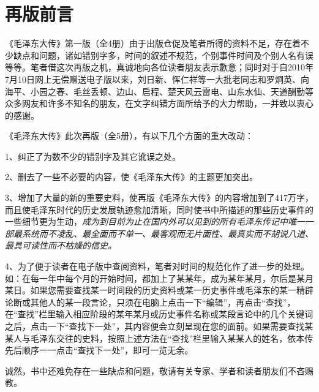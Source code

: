 \documentclass[../../dazhuan.tex]{subfiles}
\begin{document}
\clearpage
\chapter*{再版前言}
   
《毛泽东大传》第一版（全4册）由于出版仓促及笔者所得的资料不足，存在着不少缺点和问题，诸如错别字多，时间的叙述不规范，个别事件时间及个别人名有误等等。笔者借这次再版之机，真诚地向各位读者朋友表示歉意；同时对于自2010年7月10日网上无偿赠送电子版以来，刘日新、恽仁祥等一大批老同志和罗炯英、向海平、小园之春、毛丝丢顿、边山、启程、楚天风云雷电、山东水仙、天道酬勤等众多网友和许多不知名的朋友，在文字纠错方面所给予的大力帮助，一并致以衷心的感谢。

《毛泽东大传》此次再版（全5册），有以下几个方面的重大改动：

1、纠正了为数不少的错别字及其它讹误之处。

2、删去了一些不必要的内容，使《毛泽东大传》的主题更加突出。

3、增加了大量的新的重要史料，使再版《毛泽东大传》的内容增加到了417万字，而且使毛泽东时代的历史发展轨迹愈加清晰，同时使书中所描述的那些历史事件的一些细节更为生动，\emph{成为到目前为止在国内外可以见到的所有毛泽东传记中唯一一部最系统而不凌乱、最全面而不单一、最客观而无片面性、最真实而不胡说八道、最具可读性而不枯燥的信史。}

4、为了便于读者在电子版中查阅资料，笔者对时间的规范化作了进一步的处理。如：在每一年中每个月的开始时间，都加上了某某年，成为某年某月，尔后是某月某日。如果您需要查找某一时间段的历史资料或某一历史事件或毛泽东的某一精辟论断或其他人的某一段言论，只须在电脑上点击一下“编辑”，再点击“查找”，在“查找”栏里输入相应阶段的某年某月或历史事件名称或某段言论中的几个关键词之后，点击一下“查找下一处”，其内容便会立刻呈现在您的面前。如果需要查找某某人与毛泽东交往的史料，按照上述方法在“查找”栏里输入某某人的姓名，依本传先后顺序一一点击“查找下一处”，即可一览无余。

诚然，书中还难免存在一些缺点和问题，敬请有关专家、学者和读者朋友们不吝赐教。

\mbox{}\par
{}
\end{document}
